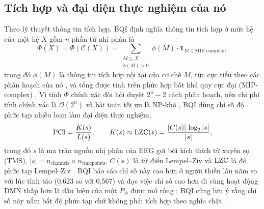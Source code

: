 \subsection{Tích hợp và đại diện thực nghiệm của nó}
\label{sec:theory-phi}
Theo lý thuyết thông tin tích hợp, BQI định nghĩa thông tin tích hợp ở mức hệ của một hệ $X$ gồm $n$ phần tử nhị phân là
\begin{equation}
  \Phi(X)=\Phi(\mathcal C(X))=\sum_{\substack{M\subseteq X\\ \phi(M)>0}}\phi(M)\cdot\mathbf 1_{M\in\text{MIP-complex}},
  \label{eq:bqi-phi}
\end{equation}
trong đó $\phi(M)$ là thông tin tích hợp nội tại của cơ chế $M$, tức cực tiểu theo các phân hoạch của nó \cite[pt.~(47)]{BQI}, và tổng được tính trên phức hợp bất khả quy cực đại (MIP-complex) \cite[Mục~6.1, pt.~(48)]{BQI}. Vì tính $\Phi$ chính xác đòi hỏi duyệt $2^n-2$ cách phân hoạch, nên chi phí tính chính xác là $\mathcal O(2^n)$ và bài toán tối ưu là NP-khó \cite[Mệnh đề~6.1]{BQI}, BQI dùng chỉ số độ phức tạp nhiễu loạn làm đại diện thực nghiệm,
\begin{equation}
  \mathrm{PCI}=\frac{K(s)}{L(s)},\qquad K(s)\approx\mathrm{LZC}(s)=\frac{|C(s)|\,\log_2|s|}{|s|},
  \label{eq:bqi-pci}
\end{equation}
trong đó $s$ là ma trận nguồn nhị phân của EEG gợi bởi kích thích từ xuyên sọ (TMS), $|s|=n_{\mathrm{channels}}\times n_{\mathrm{timepoints}}$, $C(s)$ là từ điển Lempel--Ziv và $\mathrm{LZC}$ là độ phức tạp Lempel--Ziv \cite[Mục~6.3, pt.~(49)]{BQI}. BQI báo cáo chỉ số này cao hơn ở người thiền lâu năm so với lúc tỉnh táo (0,623 so với 0,567) và đọc việc chỉ số cao hơn đi cùng hoạt động DMN thấp hơn là dấu hiệu của một $P_{\mathcal B}$ được mở rộng \cite[Bảng~4 và Nhận xét~6.1]{BQI}; BQI cũng lưu ý rằng chỉ số này nắm bắt độ phức tạp chứ không phải tích hợp theo nghĩa chặt \cite[Mục~11.3]{BQI}.

